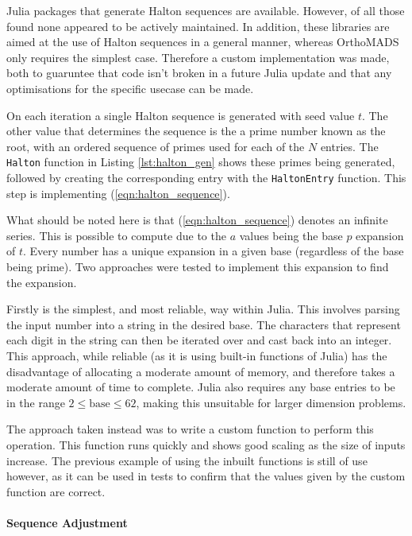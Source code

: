 Julia packages that generate Halton sequences are available. However, of all those found none appeared to be actively maintained. In addition, these libraries are aimed at the use of Halton sequences in a general manner, whereas OrthoMADS only requires the simplest case. Therefore a custom implementation was made, both to guaruntee that code isn't broken in a future Julia update and that any optimisations for the specific usecase can be made. 

On each iteration a single Halton sequence is generated with seed value $t$. The other value that determines the sequence is the a prime number known as the root, with an ordered sequence of primes used for each of the $N$ entries. The \texttt{Halton} function in Listing \ref{lst:halton_gen} shows these primes being generated, followed by creating the corresponding entry with the \texttt{HaltonEntry} function. This step is implementing (\ref{eqn:halton_sequence}). 



What should be noted here is that (\ref{eqn:halton_sequence}) denotes an infinite series. This is possible to compute due to the $a$ values being the base $p$ expansion of $t$. Every number has a unique expansion in a given base (regardless of the base being prime). Two approaches were tested to implement this expansion to find the expansion. 

Firstly is the simplest, and most reliable, way within Julia. This involves parsing the input number into a string in the desired base. The characters that represent each digit in the string can then be iterated over and cast back into an integer. This approach, while reliable (as it is using built-in functions of Julia) has the disadvantage of allocating a moderate amount of memory, and therefore takes a moderate amount of time to complete. Julia also requires any base entries to be in the range $2\leq \text{base} \leq 62$, making this unsuitable for larger dimension problems. 

The approach taken instead was to write a custom function to perform this operation. This function runs quickly and shows good scaling as the size of inputs increase. The previous example of using the inbuilt functions is still of use however, as it can be used in tests to confirm that the values given by the custom function are correct. 

\paragraph{Sequence Adjustment}\\

